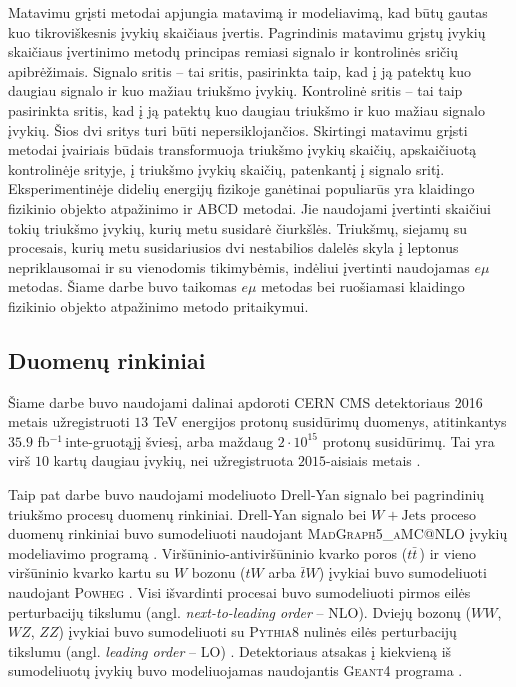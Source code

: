 \documentclass[a4paper, 12pt, oneside]{article}
\newcommand{\emu}{e\mu}
\newcommand{\WJets}{W\! +\!\mathrm{Jets}}
\newcommand{\invfb}{fb$^{-1}\,$}
\begin{document}
Matavimu grįsti metodai apjungia matavimą ir modeliavimą, kad būtų gautas kuo tikroviškesnis įvykių skaičiaus įvertis.
Pagrindinis matavimu grįstų įvykių skaičiaus įvertinimo metodų principas remiasi signalo ir kontrolinės sričių apibrėžimais.
Signalo sritis -- tai sritis, pasirinkta taip, kad į ją patektų kuo daugiau signalo ir kuo mažiau triukšmo įvykių.
Kontrolinė sritis -- tai taip pasirinkta sritis, kad į ją patektų kuo daugiau triukšmo ir kuo mažiau signalo įvykių.
Šios dvi sritys turi būti nepersiklojančios.
Skirtingi matavimu grįsti metodai įvairiais būdais transformuoja triukšmo įvykių skaičių, apskaičiuotą kontrolinėje
srityje, į triukšmo įvykių skaičių, patenkantį į signalo sritį.
Eksperimentinėje didelių energijų fizikoje ganėtinai populiarūs yra klaidingo fizikinio objekto atpažinimo ir ABCD metodai.
Jie naudojami įvertinti skaičiui tokių triukšmo įvykių, kurių metu susidarė čiurkšlės.
Triukšmų, siejamų su procesais, kurių metu susidariusios dvi nestabilios dalelės skyla į leptonus nepriklausomai ir su
vienodomis tikimybėmis, indėliui įvertinti naudojamas $\emu$ metodas.
Šiame darbe buvo taikomas $\emu$ metodas bei ruošiamasi klaidingo fizikinio objekto atpažinimo metodo pritaikymui.

\subsection{Duomenų rinkiniai}

Šiame darbe buvo naudojami dalinai apdoroti CERN CMS detektoriaus 2016 metais užregistruoti $13$ TeV
energijos protonų susidūrimų duomenys, atitinkantys $35.9$ \invfb inte-gruotąjį šviesį, arba maždaug
$2 \cdot 10^{15}$ protonų susidūrimų.
Tai yra virš $10$ kartų daugiau įvykių, nei užregistruota $2015$-aisiais metais \cite{DY2018}.

Taip pat darbe buvo naudojami modeliuoto Drell-Yan signalo bei pagrindinių triukšmo procesų duomenų rinkiniai.
Drell-Yan signalo bei $\WJets$ proceso duomenų rinkiniai buvo sumodeliuoti naudojant
\textsc{MadGraph5\_aMC@NLO} įvykių modeliavimo programą \cite{MG_aMCatNLO}.
Viršūninio-antiviršūninio kvarko poros ($t\bar{t}\,$) ir vieno viršūninio kvarko kartu su $W$ bozonu ($tW$ arba
$\bar{t}W$) įvykiai buvo sumodeliuoti naudojant \textsc{Powheg} \cite{powheg_ttbar, powheg_tW}.
Visi išvardinti procesai buvo sumodeliuoti pirmos eilės perturbacijų tikslumu (angl. \textit{next-to-leading order} -- NLO).
Dviejų bozonų ($WW$, $WZ$, $ZZ$) įvykiai buvo sumodeliuoti su \textsc{Pythia8} nulinės eilės perturbacijų tikslumu
(angl. \textit{leading order} -- LO) \cite{pythia82}.
Detektoriaus atsakas į kiekvieną iš sumodeliuotų įvykių buvo modeliuojamas naudojantis \textsc{Geant4} programa
\cite{geant4}.
\end{document}
